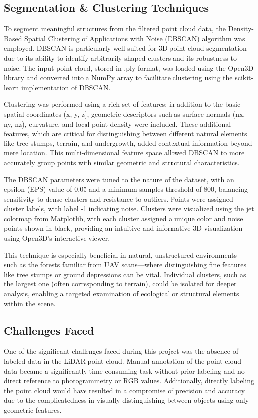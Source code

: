 \documentclass[../report.tex]{subfiles}
\begin{document}
        \subsection{Segmentation & Clustering Techniques}

    To segment meaningful structures from the filtered point cloud data, the Density-Based Spatial Clustering of Applications with Noise (DBSCAN)\cite{DBSCan_Grammarly} algorithm was employed. DBSCAN is particularly well-suited for 3D point cloud segmentation due to its ability to identify arbitrarily shaped clusters and its robustness to noise. The input point cloud, stored in .ply format, was loaded using the Open3D library and converted into a NumPy array to facilitate clustering using the scikit-learn implementation of DBSCAN.
    
    Clustering was performed using a rich set of features: in addition to the basic spatial coordinates (x, y, z), geometric descriptors such as surface normals (nx, ny, nz), curvature, and local point density were included. These additional features, which are critical for distinguishing between different natural elements like tree stumps, terrain, and undergrowth, added contextual information beyond mere location. This multi-dimensional feature space allowed DBSCAN to more accurately group points with similar geometric and structural characteristics.
    
    The DBSCAN parameters were tuned to the nature of the dataset, with an epsilon (EPS) value of 0.05 and a minimum samples threshold of 800, balancing sensitivity to dense clusters and resistance to outliers. Points were assigned cluster labels, with label -1 indicating noise. Clusters were visualized using the jet colormap from Matplotlib, with each cluster assigned a unique color and noise points shown in black, providing an intuitive and informative 3D visualization using Open3D’s interactive viewer.\cite{dbscan_eps}\cite{dbscan_eps2}
    
    This technique is especially beneficial in natural, unstructured environments—such as the forests familiar from UAV scans—where distinguishing fine features like tree stumps or ground depressions can be vital. Individual clusters, such as the largest one (often corresponding to terrain), could be isolated for deeper analysis, enabling a targeted examination of ecological or structural elements within the scene.
        
	\subsection{Challenges Faced}
    One of the significant challenges faced during this project was the absence of labeled data in the LiDAR point cloud. Manual annotation of the point cloud data became a significantly time-consuming task without prior labeling and no direct reference to photogrammetry or RGB values. Additionally, directly labeling the point cloud would have resulted in a compromise of precision and accuracy due to the complicatedness in visually distinguishing between objects using only geometric features.
\end{document}
